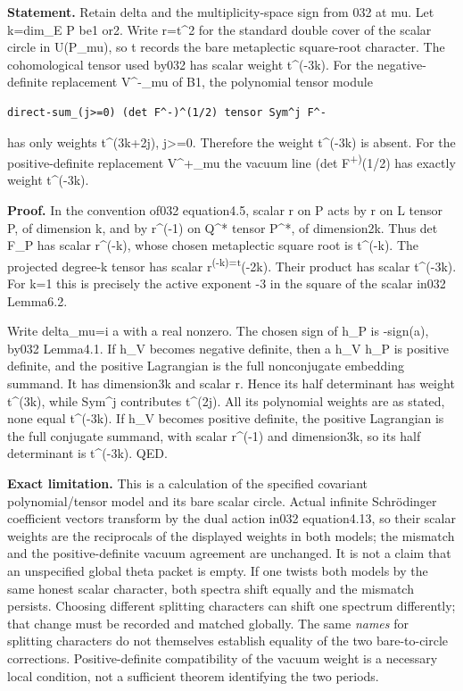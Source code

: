 \textbf{Statement.} Retain delta and the multiplicity-space sign from 032 at mu. Let k=dim\_E P be1 or2. Write r=t\^{}2 for the standard double cover of the scalar circle in U(P\_mu), so t records the bare metaplectic square-root character. The cohomological tensor used by032 has scalar weight t\^{}(-3k). For the negative-definite replacement V\^{}-\_mu of B1, the polynomial tensor module

\begin{verbatim}
direct-sum_(j>=0) (det F^-)^(1/2) tensor Sym^j F^-
\end{verbatim}

has only weights t\^{}(3k+2j), j\textgreater=0. Therefore the weight t\^{}(-3k) is absent. For the positive-definite replacement V\^{}+\_mu the vacuum line (det F\textsuperscript{+)}(1/2) has exactly weight t\^{}(-3k).

\textbf{Proof.} In the convention of032 equation4.5, scalar r on P acts by r on L tensor P, of dimension k, and by r\^{}(-1) on Q\^{}* tensor P\^{}*, of dimension2k. Thus det F\_P has scalar r\^{}(-k), whose chosen metaplectic square root is t\^{}(-k). The projected degree-k tensor has scalar r\textsuperscript{(-k)=t}(-2k). Their product has scalar t\^{}(-3k). For k=1 this is precisely the active exponent -3 in the square of the scalar in032 Lemma6.2.

Write delta\_mu=i a with a real nonzero. The chosen sign of h\_P is -sign(a), by032 Lemma4.1. If h\_V becomes negative definite, then a h\_V h\_P is positive definite, and the positive Lagrangian is the full nonconjugate embedding summand. It has dimension3k and scalar r. Hence its half determinant has weight t\^{}(3k), while Sym\^{}j contributes t\^{}(2j). All its polynomial weights are as stated, none equal t\^{}(-3k). If h\_V becomes positive definite, the positive Lagrangian is the full conjugate summand, with scalar r\^{}(-1) and dimension3k, so its half determinant is t\^{}(-3k). QED.

\textbf{Exact limitation.} This is a calculation of the specified covariant polynomial/tensor model and its bare scalar circle. Actual infinite Schrödinger coefficient vectors transform by the dual action in032 equation4.13, so their scalar weights are the reciprocals of the displayed weights in both models; the mismatch and the positive-definite vacuum agreement are unchanged. It is not a claim that an unspecified global theta packet is empty. If one twists both models by the same honest scalar character, both spectra shift equally and the mismatch persists. Choosing different splitting characters can shift one spectrum differently; that change must be recorded and matched globally. The same \emph{names} for splitting characters do not themselves establish equality of the two bare-to-circle corrections. Positive-definite compatibility of the vacuum weight is a necessary local condition, not a sufficient theorem identifying the two periods.

